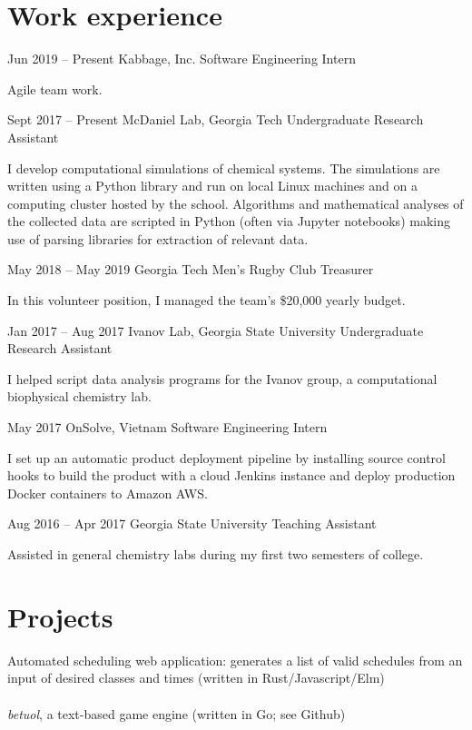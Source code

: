 \documentclass{tccv}
\begin{document}
\begin{minipage}[t]{0.65\textwidth}
\section{Work experience}

\begin{eventlist}

\item{Jun 2019 -- Present}
     {Kabbage, Inc.}
     {Software Engineering Intern}
    
    Agile team work.

\item{Sept 2017 -- Present}
     {McDaniel Lab, Georgia Tech}
     {Undergraduate Research Assistant}

    I develop computational simulations of chemical systems. The simulations are written using a Python library and run on local Linux machines and on a computing cluster hosted by the school. Algorithms and mathematical analyses of the collected data are scripted in Python (often via Jupyter notebooks) making use of parsing libraries for extraction of relevant data.

\item{May 2018 -- May 2019}
     {Georgia Tech Men's Rugby Club}
     {Treasurer}

    In this volunteer position, I managed the team's \$20,000 yearly budget.

\item{Jan 2017 -- Aug 2017}
     {Ivanov Lab, Georgia State University}
     {Undergraduate Research Assistant}

    I helped script data analysis programs for the Ivanov group, a computational biophysical chemistry lab.

\item{May 2017}
     {OnSolve, Vietnam}
     {Software Engineering Intern}

    I set up an automatic product deployment pipeline by installing source control hooks to build the product with a cloud Jenkins instance and deploy production Docker containers to Amazon AWS.

\item{Aug 2016 -- Apr 2017}
     {Georgia State University}
     {Teaching Assistant}

    Assisted in general chemistry labs during my first two semesters of college.

\section{Projects}

Automated scheduling web application: generates a list of valid schedules from an input of desired classes and times (written in Rust/Javascript/Elm) \\\\
\emph{betuol}, a text-based game engine (written in Go; see Github)

\end{eventlist}
\end{minipage}
\end{document}
